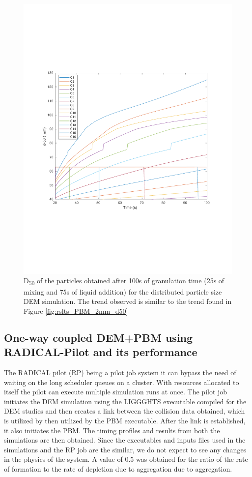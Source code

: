 \documentclass[preprint,11pt,authoryear]{elsarticle}
\begin{document}
\begin{figure}
\centering
\includegraphics[scale=0.5]{rslts_pbm_d50_128_555.pdf}
\caption{D\textsubscript{50} of the particles obtained after 100s of granulation time (25s of mixing and 75s of 
liquid addition) for the distributed particle size DEM simulation. The trend observed is similar to the trend 
found in Figure \ref{fig:rslts_PBM_2mm_d50}}
\label{fig:rslts_PBM_psd_d50}
\end{figure}


\subsection{One-way coupled DEM+PBM using RADICAL-Pilot and its performance} 
The RADICAL pilot (RP) being a pilot job system it can bypass the need of waiting on the long scheduler
queues on a cluster. With resources allocated to itself the pilot can execute multiple simulation runs 
at once. The pilot job initiates the DEM simulation using the LIGGGHTS executable compiled for the DEM
studies and then creates a link between the collision data obtained, which is utilized by then utilized 
by the PBM executable. After the link is established, it also initiates the PBM. The timing profiles and
results from both the simulations are then obtained. Since the executables and inputs files used in the 
simulations and the RP job are the similar, we do not expect to see any changes in the physics of the 
system. A value of 0.5 was obtained for the ratio of the rate of formation to the rate of depletion due to aggregation
due to aggregation.
\end{document}
